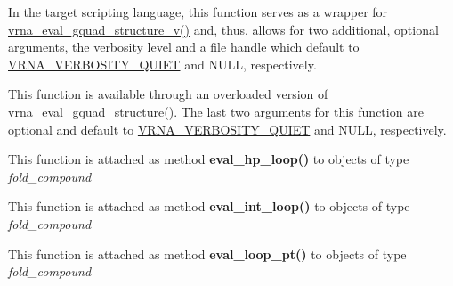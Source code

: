 \begin{DoxyRefList}
\item[\label{wrappers__wrappers000037}%
\Hypertarget{wrappers__wrappers000037}%
Global \mbox{\hyperlink{group__eval_ga3263504825ef4b523eba797c99921df4}{vrna\+\_\+eval\+\_\+gquad\+\_\+structure}} (const char $\ast$string, const char $\ast$structure)]In the target scripting language, this function serves as a wrapper for \mbox{\hyperlink{group__eval_gaeaa2bdbc1b5d78c667e735fbdff87fff}{vrna\+\_\+eval\+\_\+gquad\+\_\+structure\+\_\+v()}} and, thus, allows for two additional, optional arguments, the verbosity level and a file handle which default to \mbox{\hyperlink{eval_8h_af4afe19780b61b4962c613bde324128b}{V\+R\+N\+A\+\_\+\+V\+E\+R\+B\+O\+S\+I\+T\+Y\+\_\+\+Q\+U\+I\+ET}} and N\+U\+LL, respectively.  
\item[\label{wrappers__wrappers000047}%
\Hypertarget{wrappers__wrappers000047}%
Global \mbox{\hyperlink{group__eval_gaeaa2bdbc1b5d78c667e735fbdff87fff}{vrna\+\_\+eval\+\_\+gquad\+\_\+structure\+\_\+v}} (const char $\ast$string, const char $\ast$structure, int verbosity\+\_\+level, F\+I\+LE $\ast$file)]This function is available through an overloaded version of \mbox{\hyperlink{group__eval_ga3263504825ef4b523eba797c99921df4}{vrna\+\_\+eval\+\_\+gquad\+\_\+structure()}}. The last two arguments for this function are optional and default to \mbox{\hyperlink{eval_8h_af4afe19780b61b4962c613bde324128b}{V\+R\+N\+A\+\_\+\+V\+E\+R\+B\+O\+S\+I\+T\+Y\+\_\+\+Q\+U\+I\+ET}} and N\+U\+LL, respectively.  
\item[\label{wrappers__wrappers000033}%
\Hypertarget{wrappers__wrappers000033}%
Global \mbox{\hyperlink{group__loops_gab3eb4651dc26dc2b653a57dd340d7e68}{vrna\+\_\+eval\+\_\+hp\+\_\+loop}} (vrna\+\_\+fold\+\_\+compound\+\_\+t $\ast$vc, int i, int j)]This function is attached as method {\bfseries eval\+\_\+hp\+\_\+loop()} to objects of type {\itshape fold\+\_\+compound}  
\item[\label{wrappers__wrappers000034}%
\Hypertarget{wrappers__wrappers000034}%
Global \mbox{\hyperlink{group__loops_ga018f1314dbbae42fdd27c94670b61721}{vrna\+\_\+eval\+\_\+int\+\_\+loop}} (vrna\+\_\+fold\+\_\+compound\+\_\+t $\ast$vc, int i, int j, int k, int l)]This function is attached as method {\bfseries eval\+\_\+int\+\_\+loop()} to objects of type {\itshape fold\+\_\+compound}  
\item[\label{wrappers__wrappers000030}%
\Hypertarget{wrappers__wrappers000030}%
Global \mbox{\hyperlink{group__eval_ga730ba4df55c02fd530a0cddd49faf760}{vrna\+\_\+eval\+\_\+loop\+\_\+pt}} (vrna\+\_\+fold\+\_\+compound\+\_\+t $\ast$vc, int i, const short $\ast$pt)]This function is attached as method {\bfseries eval\+\_\+loop\+\_\+pt()} to objects of type {\itshape fold\+\_\+compound}  

\end{DoxyRefList}
